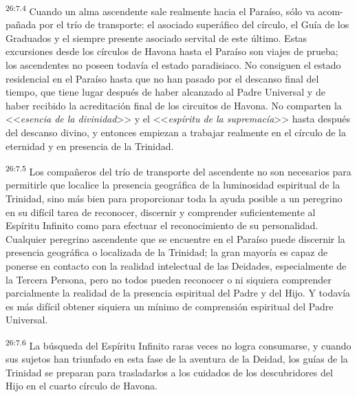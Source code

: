\par
\textsuperscript{26:7.4} Cuando un alma ascendente sale realmente hacia el Paraíso, sólo va acom-pañada por el trío de transporte: el asociado superáfico del círculo, el Guía de los Graduados y el siempre presente asociado servital de este último. Estas excursiones desde los círculos de Havona hasta el Paraíso son viajes de prueba; los ascendentes no poseen todavía el estado paradisiaco. No consiguen el estado residencial en el Paraíso hasta que no han pasado por el descanso final del tiempo, que tiene lugar después de haber alcanzado al Padre Universal y de haber recibido la acreditación final de los circuitos de Havona. No comparten la <<\textit{esencia de la divinidad}>> y el <<\textit{espíritu de la supremacía}>> hasta después del descanso divino, y entonces empiezan a trabajar realmente en el círculo de la eternidad y en presencia de la Trinidad.

\par
\textsuperscript{26:7.5} Los compañeros del trío de transporte del ascendente no son necesarios para permitirle que localice la presencia geográfica de la luminosidad espiritual de la Trinidad, sino más bien para proporcionar toda la ayuda posible a un peregrino en su difícil tarea de reconocer, discernir y comprender suficientemente al Espíritu Infinito como para efectuar el reconocimiento de su personalidad. Cualquier peregrino ascendente que se encuentre en el Paraíso puede discernir la presencia geográfica o localizada de la Trinidad; la gran mayoría es capaz de ponerse en contacto con la realidad intelectual de las Deidades, especialmente de la Tercera Persona, pero no todos pueden reconocer o ni siquiera comprender parcialmente la realidad de la presencia espiritual del Padre y del Hijo. Y todavía es más difícil obtener siquiera un mínimo de comprensión espiritual del Padre Universal.

\par
\textsuperscript{26:7.6} La búsqueda del Espíritu Infinito raras veces no logra consumarse, y cuando sus sujetos han triunfado en esta fase de la aventura de la Deidad, los guías de la Trinidad se preparan para trasladarlos a los cuidados de los descubridores del Hijo en el cuarto círculo de Havona.

